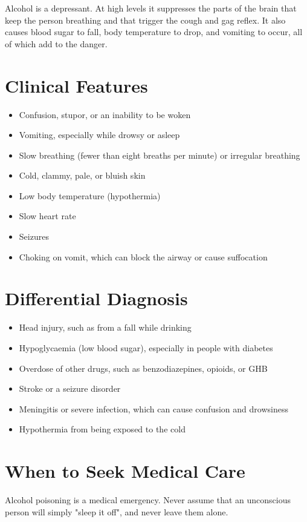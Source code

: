 Alcohol is a depressant. At high levels it suppresses the parts of the brain that keep the person breathing and that trigger the cough and gag reflex. It also causes blood sugar to fall, body temperature to drop, and vomiting to occur, all of which add to the danger.

\section*{Clinical Features}
\begin{itemize}
    \item Confusion, stupor, or an inability to be woken
    \item Vomiting, especially while drowsy or asleep
    \item Slow breathing (fewer than eight breaths per minute) or irregular breathing
    \item Cold, clammy, pale, or bluish skin
    \item Low body temperature (hypothermia)
    \item Slow heart rate
    \item Seizures
    \item Choking on vomit, which can block the airway or cause suffocation
\end{itemize}

\section*{Differential Diagnosis}
\begin{itemize}
    \item Head injury, such as from a fall while drinking
    \item Hypoglycaemia (low blood sugar), especially in people with diabetes
    \item Overdose of other drugs, such as benzodiazepines, opioids, or GHB
    \item Stroke or a seizure disorder
    \item Meningitis or severe infection, which can cause confusion and drowsiness
    \item Hypothermia from being exposed to the cold
\end{itemize}

\section*{When to Seek Medical Care}
Alcohol poisoning is a medical emergency. Never assume that an unconscious person will simply "sleep it off", and never leave them alone.


